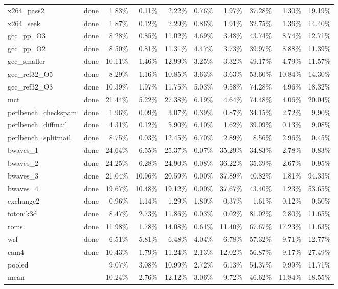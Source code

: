 \documentclass[10pt,a4paper,landscape]{article}
\begin{document}
{\begin{longtable}{llrrrrrrrr}
x264\_pass2 & done & 1.83\% & 0.11\% & 2.22\% & 0.76\% & 1.97\% & 37.28\% & 1.30\% & 19.19\% \\
x264\_seek & done & 1.87\% & 0.12\% & 2.29\% & 0.86\% & 1.91\% & 32.75\% & 1.36\% & 14.40\% \\
gcc\_pp\_O3 & done & 8.28\% & 0.85\% & 11.02\% & 4.69\% & 3.48\% & 43.74\% & 8.74\% & 12.71\% \\
gcc\_pp\_O2 & done & 8.50\% & 0.81\% & 11.31\% & 4.47\% & 3.73\% & 39.97\% & 8.88\% & 11.39\% \\
gcc\_smaller & done & 10.11\% & 1.46\% & 12.99\% & 3.25\% & 3.32\% & 49.17\% & 4.79\% & 11.57\% \\
gcc\_ref32\_O5 & done & 8.29\% & 1.16\% & 10.85\% & 3.63\% & 3.63\% & 53.60\% & 10.84\% & 14.30\% \\
gcc\_ref32\_O3 & done & 10.39\% & 1.97\% & 11.75\% & 5.03\% & 9.58\% & 74.28\% & 4.96\% & 18.32\% \\
mcf & done & 21.44\% & 5.22\% & 27.38\% & 6.19\% & 4.64\% & 74.48\% & 4.06\% & 20.04\% \\
perlbench\_checkspam & done & 1.96\% & 0.09\% & 3.07\% & 0.39\% & 0.87\% & 34.15\% & 2.72\% & 9.90\% \\
perlbench\_diffmail & done & 4.31\% & 0.12\% & 5.90\% & 6.10\% & 1.62\% & 39.09\% & 0.13\% & 9.08\% \\
perlbench\_splitmail & done & 8.75\% & 0.03\% & 12.45\% & 6.70\% & 2.89\% & 8.56\% & 2.96\% & 0.45\% \\
bwaves\_1 & done & 24.64\% & 6.55\% & 25.37\% & 0.07\% & 35.29\% & 34.83\% & 2.78\% & 0.83\% \\
bwaves\_2 & done & 24.25\% & 6.28\% & 24.90\% & 0.08\% & 36.22\% & 35.39\% & 2.67\% & 0.95\% \\
bwaves\_3 & done & 21.04\% & 10.96\% & 20.59\% & 0.00\% & 37.89\% & 40.82\% & 1.81\% & 94.33\% \\
bwaves\_4 & done & 19.67\% & 10.48\% & 19.12\% & 0.00\% & 37.67\% & 43.40\% & 1.23\% & 53.65\% \\
exchange2 & done & 0.96\% & 1.14\% & 1.29\% & 1.80\% & 0.37\% & 1.61\% & 0.12\% & 0.50\% \\
fotonik3d & done & 8.47\% & 2.73\% & 11.86\% & 0.03\% & 0.02\% & 81.02\% & 2.80\% & 11.65\% \\
roms & done & 11.98\% & 1.78\% & 14.08\% & 0.61\% & 11.40\% & 67.67\% & 17.23\% & 11.63\% \\
wrf & done & 6.51\% & 5.81\% & 6.48\% & 4.04\% & 6.78\% & 57.32\% & 9.71\% & 12.77\% \\
cam4 & done & 10.43\% & 1.79\% & 11.24\% & 2.13\% & 12.02\% & 56.87\% & 9.17\% & 27.49\% \\
\midrule
pooled &  & 9.07\% & 3.08\% & 10.99\% & 2.72\% & 6.13\% & 54.37\% & 9.99\% & 11.71\% \\
mean &  & 10.24\% & 2.76\% & 12.12\% & 3.06\% & 9.72\% & 46.62\% & 11.84\% & 18.55\% \\
\end{longtable}
}
\end{document}
